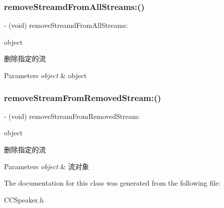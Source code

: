 \subsubsection{\texorpdfstring{remove\+Streamd\+From\+All\+Streams\+:()}{removeStreamdFromAllStreams:()}}
{\footnotesize\ttfamily -\/ (void) remove\+Streamd\+From\+All\+Streams\+: \begin{DoxyParamCaption}\item[{(\hyperlink{interface_c_c_stream}{C\+C\+Stream} $\ast$)}]{object }\end{DoxyParamCaption}}

删除指定的流 
\begin{DoxyParams}{Parameters}
{\em object} & object \\
\hline
\end{DoxyParams}
\mbox{\label{interface_c_c_speaker_a6d2ff7ef65cf4bb27aaea04abdcea892}} 
\subsubsection{\texorpdfstring{remove\+Stream\+From\+Removed\+Stream\+:()}{removeStreamFromRemovedStream:()}}
{\footnotesize\ttfamily -\/ (void) remove\+Stream\+From\+Removed\+Stream\+: \begin{DoxyParamCaption}\item[{(\hyperlink{interface_c_c_stream}{C\+C\+Stream} $\ast$)}]{object }\end{DoxyParamCaption}}

删除指定的流 
\begin{DoxyParams}{Parameters}
{\em object} & 流对象 \\
\hline
\end{DoxyParams}


The documentation for this class was generated from the following file\+:\begin{DoxyCompactItemize}
\item 
C\+C\+Speaker.\+h\end{DoxyCompactItemize}

